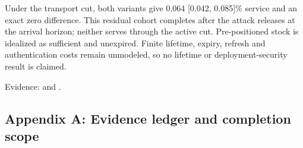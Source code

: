 Under the transport cut, both variants give 0.064 {[}0.042, 0.085{]}\% service and an exact zero difference. This residual cohort completes after the attack releases at the arrival horizon; neither serves through the active cut. Pre-positioned stock is idealized as sufficient and unexpired. Finite lifetime, expiry, refresh and authentication costs remain unmodeled, so no lifetime or deployment-security result is claimed.

Evidence:  and .

\subsection{Appendix A: Evidence ledger and completion scope}\label{appendix-a-evidence-ledger-and-completion-scope}

